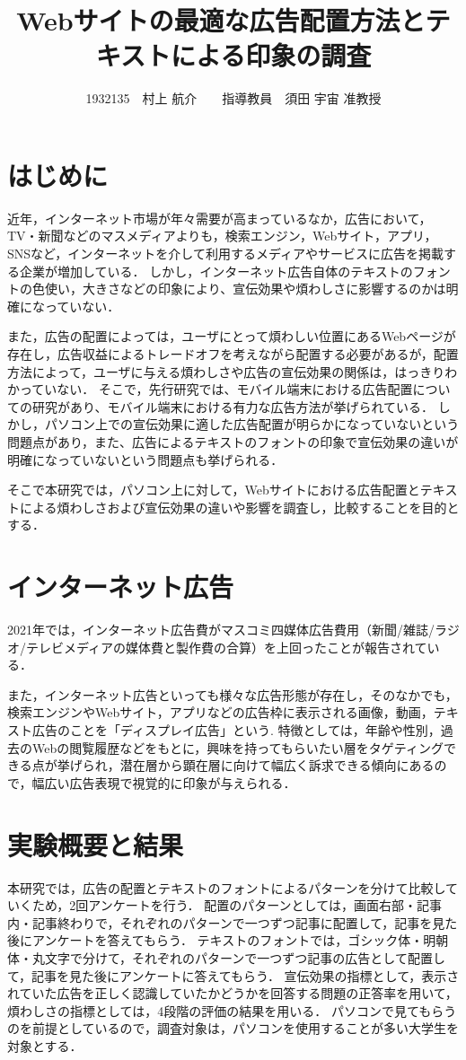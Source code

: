 \documentclass[twocolumn,10pt,a4j]{ltjsarticle}
\title{Webサイトの最適な広告配置方法とテキストによる印象の調査}
\author{1932135　村上 航介　　指導教員　須田 宇宙 准教授}
\date{}
\begin{document}
\maketitle

\section{はじめに}
近年，インターネット市場が年々需要が高まっているなか，広告において，TV・新聞などのマスメディアよりも，検索エンジン，Webサイト，アプリ，SNSなど，インターネットを介して利用するメディアやサービスに広告を掲載する企業が増加している．
しかし，インターネット広告自体のテキストのフォントの色使い，大きさなどの印象により、宣伝効果や煩わしさに影響するのかは明確になっていない．

また，広告の配置によっては，ユーザにとって煩わしい位置にあるWebページが存在し，広告収益によるトレードオフを考えながら配置する必要があるが，配置方法によって，ユーザに与える煩わしさや広告の宣伝効果の関係は，はっきりわかっていない．
そこで，先行研究では、モバイル端末における広告配置についての研究があり、モバイル端末における有力な広告方法が挙げられている\cite{mobile}．
しかし，パソコン上での宣伝効果に適した広告配置が明らかになっていないという問題点があり，また、広告によるテキストのフォントの印象で宣伝効果の違いが明確になっていないという問題点も挙げられる．

そこで本研究では，パソコン上に対して，Webサイトにおける広告配置とテキストによる煩わしさおよび宣伝効果の違いや影響を調査し，比較することを目的とする．

\section{インターネット広告}
2021年では，インターネット広告費がマスコミ四媒体広告費用（新聞/雑誌/ラジオ/テレビメディアの媒体費と製作費の合算）を上回ったことが報告されている\cite{dentsu}．

また，インターネット広告といっても様々な広告形態が存在し，そのなかでも，検索エンジンやWebサイト，アプリなどの広告枠に表示される画像，動画，テキスト広告のことを「ディスプレイ広告」という.
特徴としては，年齢や性別，過去のWebの閲覧履歴などをもとに，興味を持ってもらいたい層をタゲティングできる点が挙げられ，潜在層から顕在層に向けて幅広く訴求できる傾向にあるので，幅広い広告表現で視覚的に印象が与えられる．

\section{実験概要と結果}
本研究では，広告の配置とテキストのフォントによるパターンを分けて比較していくため，2回アンケートを行う．
配置のパターンとしては，画面右部・記事内・記事終わりで，それぞれのパターンで一つずつ記事に配置して，記事を見た後にアンケートを答えてもらう．
テキストのフォントでは，ゴシック体・明朝体・丸文字で分けて，それぞれのパターンで一つずつ記事の広告として配置して，記事を見た後にアンケートに答えてもらう．
宣伝効果の指標として，表示されていた広告を正しく認識していたかどうかを回答する問題の正答率を用いて，煩わしさの指標としては，4段階の評価の結果を用いる．
パソコンで見てもらうのを前提としているので，調査対象は，パソコンを使用することが多い大学生を対象とする．
\end{document}
